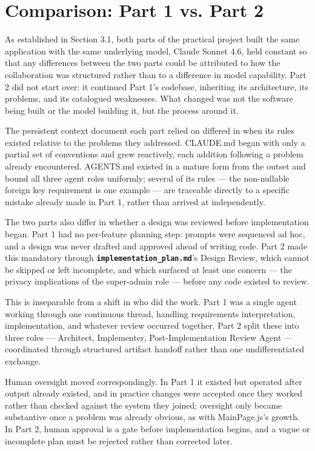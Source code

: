 \section{Comparison: Part 1 vs. Part 2}

As established in Section 3.1, both parts of the practical project built the same application with the same underlying model, Claude Sonnet 4.6, held constant so that any differences between the two parts could be attributed to how the collaboration was structured rather than to a difference in model capability. Part 2 did not start over: it continued Part 1's codebase, inheriting its architecture, its problems, and its catalogued weaknesses. What changed was not the software being built or the model building it, but the process around it.

The persistent context document each part relied on differed in when its rules existed relative to the problems they addressed. CLAUDE.md began with only a partial set of conventions and grew reactively, each addition following a problem already encountered. AGENTS.md existed in a mature form from the outset and bound all three agent roles uniformly; several of its rules --- the non-nullable foreign key requirement is one example --- are traceable directly to a specific mistake already made in Part 1, rather than arrived at independently.

The two parts also differ in whether a design was reviewed before implementation began. Part 1 had no per-feature planning step: prompts were sequenced ad hoc, and a design was never drafted and approved ahead of writing code. Part 2 made this mandatory through \textbf{\texttt{implementation\_plan.md}}'s Design Review, which cannot be skipped or left incomplete, and which surfaced at least one concern --- the privacy implications of the super-admin role --- before any code existed to review.

This is inseparable from a shift in who did the work. Part 1 was a single agent working through one continuous thread, handling requirements interpretation, implementation, and whatever review occurred together. Part 2 split these into three roles --- Architect, Implementer, Post-Implementation Review Agent --- coordinated through structured artifact handoff rather than one undifferentiated exchange.

Human oversight moved correspondingly. In Part 1 it existed but operated after output already existed, and in practice changes were accepted once they worked rather than checked against the system they joined; oversight only became substantive once a problem was already obvious, as with MainPage.js's growth. In Part 2, human approval is a gate before implementation begins, and a vague or incomplete plan must be rejected rather than corrected later.

